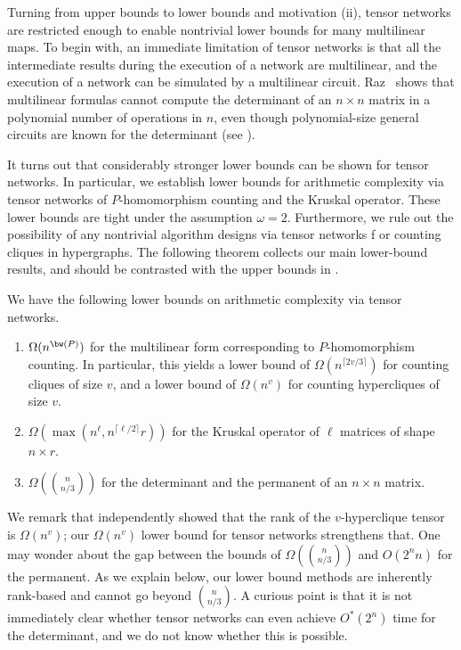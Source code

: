 Turning from upper bounds to lower bounds and motivation (ii), tensor
networks are restricted enough to enable nontrivial lower bounds for many
multilinear maps.
To begin with, an immediate limitation of tensor networks is
that all the intermediate results during the execution of a network are
multilinear, and the execution of a network can be simulated by a multilinear
circuit. Raz~\cite{Raz2013} shows that multilinear formulas cannot compute
the
determinant of an $n\times n$ matrix in a polynomial number of operations
in $n$, even though polynomial-size general circuits are known for
the determinant 
%
%
%
(see \cite{Berkowitz1984,BunchH1974,Csanky1976,Rote2001}). 
%

It turns out that considerably stronger lower bounds can be shown
for tensor networks. In particular, we establish
%
%
%
%
lower bounds for arithmetic complexity via tensor
networks of $P$-homomorphism counting and the Kruskal operator.
%
%
%
%
These lower bounds are tight 
%
under the assumption $\omega=2$. %
%
Furthermore, we rule out the possibility of any
nontrivial algorithm designs via tensor networks f
or counting cliques in hypergraphs.
The following theorem collects our main lower-bound results, 
and should be contrasted with the upper bounds
in .

\begin{theorem}
  \label{thm:lower bounds}
  We have the following lower bounds on arithmetic complexity via tensor networks.  %
  \begin{enumerate}
  \item $\Omega(n^{\bw(P)})$ for the multilinear form corresponding to $P$-homomorphism counting.  In particular, this yields a lower bound of $\Omega(n^{\lceil 2v/3 \rceil})$ for counting cliques of size $v$, and a lower bound of $\Omega(n^v)$ for counting hypercliques of size $v$.
  \item $\Omega(\max(n^\ell, n^{\lceil \ell/2\rceil}r))$ for the Kruskal operator of $\ell$ matrices of shape $n\times r$.
  \item $\Omega(\binom{n}{n/3})$ for the determinant 
%
and the %
permanent of an $n \times n$ matrix.
  \end{enumerate}
\end{theorem}

We remark that \cite{LincolnWW18} independently showed that the rank of the $v$-hyperclique tensor is $\Omega(n^v)$; our $\Omega(n^v)$ lower bound for tensor networks strengthens that.
One may wonder about the gap between the bounds of
$\Omega(\binom{n}{n/3})$ and $O(2^n n)$ for the permanent.
As we explain below, our lower bound methods are inherently rank-based
and cannot go beyond $\binom{n}{n/3}$.  A curious point is that it is 
not immediately clear whether tensor networks can even achieve 
$O^*(2^n)$ time for the determinant, and we do not know whether
%
this is possible.


